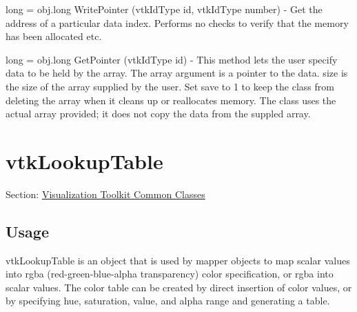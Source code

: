 \begin{DoxyItemize}
\item {\ttfamily long = obj.\-long Write\-Pointer (vtk\-Id\-Type id, vtk\-Id\-Type number)} -\/ Get the address of a particular data index. Performs no checks to verify that the memory has been allocated etc.  
\item {\ttfamily long = obj.\-long Get\-Pointer (vtk\-Id\-Type id)} -\/ This method lets the user specify data to be held by the array. The array argument is a pointer to the data. size is the size of the array supplied by the user. Set save to 1 to keep the class from deleting the array when it cleans up or reallocates memory. The class uses the actual array provided; it does not copy the data from the suppled array.  
\end{DoxyItemize}\hypertarget{vtkcommon_vtklookuptable}{}\section{vtk\-Lookup\-Table}\label{vtkcommon_vtklookuptable}
Section\-: \hyperlink{sec_vtkcommon}{Visualization Toolkit Common Classes} \hypertarget{vtkwidgets_vtkxyplotwidget_Usage}{}\subsection{Usage}\label{vtkwidgets_vtkxyplotwidget_Usage}
vtk\-Lookup\-Table is an object that is used by mapper objects to map scalar values into rgba (red-\/green-\/blue-\/alpha transparency) color specification, or rgba into scalar values. The color table can be created by direct insertion of color values, or by specifying hue, saturation, value, and alpha range and generating a table.


